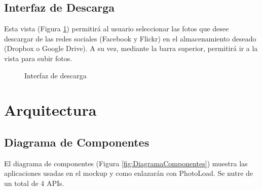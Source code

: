 \documentclass{scrartcl}
\begin{document}
\subsection{Interfaz de Descarga}
Esta vista (Figura \ref{fig:VistaDescarga}) permitirá al usuario seleccionar las fotos que desee descargar de las redes sociales (Facebook y Flickr) en el almacenamiento deseado (Dropbox o Google Drive). A su vez, mediante la barra superior, permitirá ir a la vista para subir fotos.

\begin{figure}[H]
	
	\centering
	\caption{Interfaz de descarga}
	\label{fig:VistaDescarga}
	
\end{figure}
\vspace*{2in}
\section{Arquitectura}

\subsection{Diagrama de Componentes}
El diagrama de componentes (Figura \ref{fig:DiagramaComponentes}) muestra las aplicaciones usadas en el mockup y como enlazarán con PhotoLoad. Se nutre de un total de 4 APIs.
\end{document}
